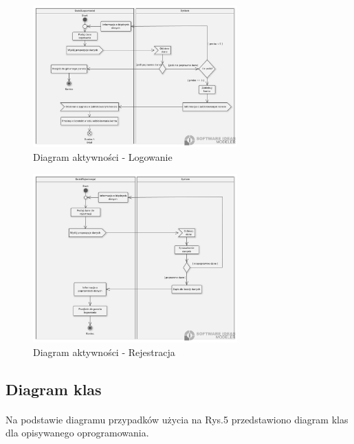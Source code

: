 \documentclass[12pt, letterpaper]{article}
\begin{document}
\begin{figure}[h]
  \centering
      \includegraphics[width=0.7\textwidth]{aclogowanie}
  \caption{Diagram aktywności - Logowanie}
\end{figure}

\begin{figure}[h]
  \centering
      \includegraphics[width=0.7\textwidth]{acrejestracja}
  \caption{Diagram aktywności - Rejestracja}
\end{figure}
		
		
\newpage
\subsection{Diagram klas}	
\paragraph{}		
Na podstawie diagramu przypadków użycia na Rys.5 przedstawiono diagram klas dla opisywanego oprogramowania.\\	
		
\end{document}
